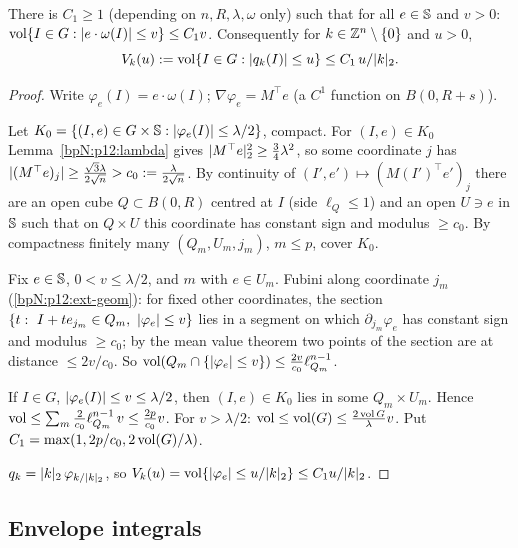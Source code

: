 \begin{lemma}\label{bpN:p12:slab}
There is $C_1\ge1$ (depending on $n,R,\lambda,\omega$ only) such that for all $e\in\mathbb S$ and $v>0$: $\operatorname{vol}\{I\in G:\lvert e\cdot\omega(I)\rvert\le v\}\le C_1v$. Consequently for $k\in\mathbb{Z}^n\setminus\{0\}$ and $u>0$,
\[V_k(u):=\operatorname{vol}\{I\in G:\lvert q_k(I)\rvert\le u\}\le C_1\,u/\lvert k\rvert_2 .\]
\end{lemma}
\begin{proof}
Write $\varphi_e(I)=e\cdot\omega(I)$; $\nabla\varphi_e=M^\top e$ (a $C^1$ function on $B(0,R+s)$).

\label{stepN:p12:sl-cover} Let $K_0=\{(I,e)\in G\times\mathbb S:\lvert \varphi_e(I)\rvert\le\lambda/2\}$, compact. For $(I,e)\in K_0$ Lemma~\ref{bpN:p12:lambda} gives $\lvert M^\top e\rvert_2^2\ge\frac34\lambda^2$, so some coordinate $j$ has $\lvert (M^\top e)_j\rvert\ge\frac{\sqrt3\lambda}{2\sqrt n}>c_0:=\frac\lambda{2\sqrt n}$. By continuity of $(I',e')\mapsto(M(I')^\top e')_j$ there are an open cube $Q\subset B(0,R)$ centred at $I$ (side $\ell_Q\le 1$) and an open $U\ni e$ in $\mathbb S$ such that on $Q\times U$ this coordinate has constant sign and modulus $\ge c_0$. By compactness finitely many $(Q_m,U_m,j_m)$, $m\le p$, cover $K_0$.

\label{stepN:p12:sl-box} Fix $e\in\mathbb S$, $0<v\le\lambda/2$, and $m$ with $e\in U_m$. Fubini along coordinate $j_m$ (\ref{bpN:p12:ext-geom}): for fixed other coordinates, the section $\{t:\ I+te_{j_m}\in Q_m,\ \abs{\varphi_e}\le v\}$ lies in a segment on which $\partial_{j_m}\varphi_e$ has constant sign and modulus $\ge c_0$; by the mean value theorem two points of the section are at distance $\le2v/c_0$. So $\operatorname{vol}(Q_m\cap\{\lvert \varphi_e\rvert\le v\})\le\frac{2v}{c_0}\ell_{Q_m}^{n-1}$.

\label{stepN:p12:sl-sum} If $I\in G$, $\lvert \varphi_e(I)\rvert\le v\le\lambda/2$, then $(I,e)\in K_0$ lies in some $Q_m\times U_m$. Hence $\operatorname{vol}\le\sum_m\frac2{c_0}\ell_{Q_m}^{n-1}\,v\le\frac{2p}{c_0}v$. For $v>\lambda/2$: $\operatorname{vol}\le\operatorname{vol}(G)\le\frac{2\operatorname{vol} G}\lambda v$. Put $C_1=\max(1,2p/c_0,2\operatorname{vol}(G)/\lambda)$.

\label{stepN:p12:sl-k} $q_k=\lvert k\rvert_2\,\varphi_{k/\lvert k\rvert_2}$, so $V_k(u)=\operatorname{vol}\{\lvert \varphi_e\rvert\le u/\lvert k\rvert_2\}\le C_1u/\lvert k\rvert_2$.
\end{proof}

\subsection{Envelope integrals}\label{bpN:p12:s-env}

